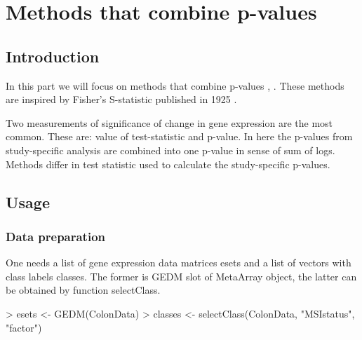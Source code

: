 \documentclass[a4paper]{report}
\begin{document}
\chapter{Methods that combine p-values}
\section*{Introduction}
In this part we will focus on methods that combine p-values \cite{Marot}, \cite{Rhodes}. These methods are inspired by Fisher's S-statistic published in 1925 \cite{Fisher25}. \par
Two measurements of significance of change in gene expression are the most common. These are: value of test-statistic and p-value. In here the p-values from study-specific analysis are combined into one p-value in sense of sum of logs. Methods differ in test statistic used to calculate the study-specific p-values. 
\section*{Usage}
\subsection*{Data preparation}
One needs a list of gene expression data matrices {\ttfamily esets} and a list of vectors with class labels {\ttfamily classes}. The former is {\ttfamily GEDM} slot of MetaArray object, the latter can be obtained by function {\ttfamily selectClass}. 
\begin{Schunk}
\begin{Sinput}
> esets <- GEDM(ColonData)
> classes <- selectClass(ColonData, "MSIstatus", "factor")
\end{Sinput}
\end{Schunk}
\end{document}
